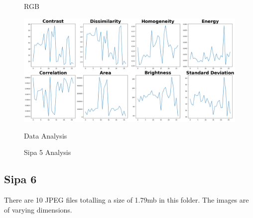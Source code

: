\begin{figure}[ht]
\begin{minipage}[t]{0.25\textwidth}
        \caption*{RGB}
    \end{minipage}\hfill
    \begin{minipage}[t]{0.50\textwidth}
        \centering
        \includegraphics[width=\textwidth]{Figures/EDA_Charts/5/da.png}
        \caption*{Data Analysis}
    \end{minipage}
    \caption{Sipa 5 Analysis}
    \label{fig:Sipa 5 Analysis}
\end{figure}

\newpage

\subsection{Sipa 6}

There are 10 JPEG files totalling a size of 1.79mb in this folder. The images are of varying dimensions.

